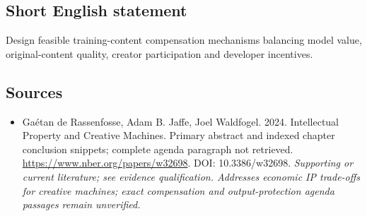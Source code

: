 \documentclass[11pt]{article}
\begin{document}
\subsection{Short English statement}
Design feasible training-content compensation mechanisms balancing model value, original-content quality, creator participation and developer incentives.

\subsection{Sources}
\begin{itemize}\raggedright
\item[\textnormal{[S1]}]\hypertarget{source:30007697:1}{} Gaétan de Rassenfosse, Adam B. Jaffe, Joel Waldfogel. 2024. Intellectual Property and Creative Machines. Primary abstract and indexed chapter conclusion snippets; complete agenda paragraph not retrieved.
\url{https://www.nber.org/papers/w32698}.
DOI: 10.3386/w32698.
{\small\textit{Supporting or current literature; see evidence qualification. Addresses economic IP trade-offs for creative machines; exact compensation and output-protection agenda passages remain unverified.}}
\end{itemize}
\end{document}
